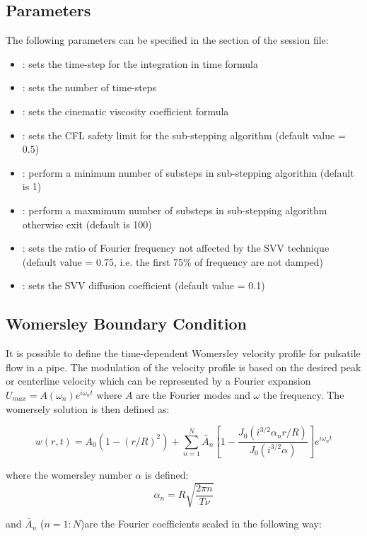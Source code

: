 \subsection{Parameters}
The following parameters can be specified in the  section of
the session file:

\begin{itemize}
\item {}: sets the time-step for the integration in time formula
\item {}: sets the number of time-steps
\item {}: sets the cinematic viscosity coefficient formula
\item {}: sets the CFL safety limit for the sub-stepping algorithm (default value = 0.5)
\item {}: perform a minimum number of substeps in sub-stepping algorithm (default is 1)
\item {}: perform a maxmimum  number of substeps in sub-stepping algorithm otherwise exit (default is 100)
\item {}: sets the ratio of Fourier frequency not affected by the SVV technique (default value = 0.75, i.e. the first 75\% of frequency are not damped)
\item {}: sets the SVV diffusion coefficient (default value = 0.1)
\end{itemize}

\subsection{Womersley Boundary Condition}

It is possible to define the time-dependent Womersley velocity profile
for pulsatile flow in a pipe. The modulation of the velocity profile
is based on the desired peak or centerline velocity which can be
represented by a Fourier expansion $U_{max}=A(\omega_n)e^{i\omega_n
  t}$ where $A$ are the Fourier modes and $\omega $ the frequency. The
womersely solution is then defined as:

$$ w(r,t) = A_0(1-(r/R)^2) + \sum_{n=1}^N
\tilde{A_n}[1-\frac{J_0(i^{3/2}\alpha_n r/R)}{J_0(i^{3/2}
    \alpha)}]e^{i\omega_n t} $$

where the womersley number $\alpha$ is defined:
$$ \alpha_n = R\sqrt{\frac{2\pi n}{T\nu}}$$

and $\tilde{A_n}$ ($n=1:N$)are the Fourier coefficients scaled in the
following way:


